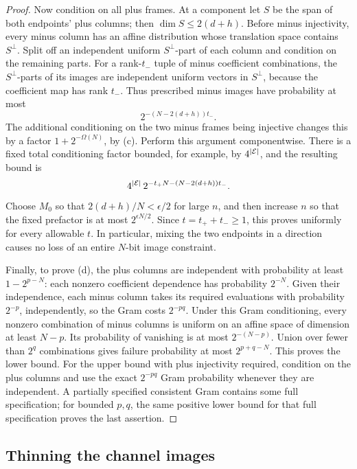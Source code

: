 \begin{proof}
Now condition on all plus frames.
At a component let \(S\) be the span of both endpoints' plus columns; then \(\dim S\le2(d+h)\).
Before minus injectivity, every minus column has an affine distribution whose translation space contains \(S^\perp\).
Split off an independent uniform \(S^\perp\)-part of each column and condition on the remaining parts.
For a rank-\(t_-\) tuple of minus coefficient combinations, the \(S^\perp\)-parts of its images are independent uniform vectors in \(S^\perp\), because the coefficient map has rank \(t_-\).
Thus prescribed minus images have probability at most
\[
 2^{-(N-2(d+h))t_-}.
\]
The additional conditioning on the two minus frames being injective changes this by a factor \(1+2^{-\Omega(N)}\), by (c).
Perform this argument componentwise.
There is a fixed total conditioning factor bounded, for example, by \(4^{|\mathcal E|}\), and the resulting bound is
\[
 4^{|\mathcal E|}\,2^{-t_+N-(N-2(d+h))t_-}.
\]
Choose \(M_0\) so that \(2(d+h)/N<\epsilon/2\) for large \(n\), and then increase \(n\) so that the fixed prefactor is at most \(2^{\epsilon N/2}\).
Since \(t=t_++t_-\ge1\), this proves  uniformly for every allowable \(t\).
In particular, mixing the two endpoints in a direction causes no loss of an entire \(N\)-bit image constraint.

Finally, to prove (d), the plus columns are independent with probability at least \(1-2^{p-N}\): each nonzero coefficient dependence has probability \(2^{-N}\).
Given their independence, each minus column takes its required evaluations with probability \(2^{-p}\), independently, so the Gram costs \(2^{-pq}\).
Under this Gram conditioning, every nonzero combination of minus columns is uniform on an affine space of dimension at least \(N-p\).
Its probability of vanishing is at most \(2^{-(N-p)}\).
Union over fewer than \(2^q\) combinations gives failure probability at most \(2^{p+q-N}\).
This proves the lower bound.
For the upper bound with plus injectivity required, condition on the plus columns and use the exact \(2^{-pq}\) Gram probability whenever they are independent.
A partially specified consistent Gram contains some full specification; for bounded \(p,q\), the same positive lower bound for that full specification proves the last assertion.
\end{proof}

\subsection{Thinning the channel images}

